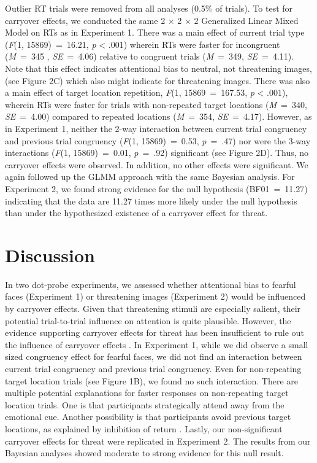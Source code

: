 \documentclass[issue,header,twocolumn,empirical, authordate,10pt]{jote-new-article}
\begin{document}
Outlier RT trials were removed from all analyses (0.5\% of trials). To test for carryover effects, we conducted the same 2 × 2 × 2 Generalized Linear Mixed Model on RTs as in Experiment 1. There was a main effect of current trial type (\emph{F}(1, 15869)~=~16.21, \emph{p }< .001) wherein RTs were faster for incongruent (\emph{M}~=~345 , \emph{SE}~=~4.06) relative to congruent trials (\emph{M}~=~349, \emph{SE}~=~4.11). Note that this effect indicates attentional bias to neutral, not threatening images, (see Figure 2C) which also might indicate for threatening images. There was also a main effect of target location repetition, \emph{F}(1, 15869~=~167.53, \emph{p }< .001), wherein RTs were faster for trials with non-repeated target locations (\emph{M}~=~340, \emph{SE}~=~4.00) compared to repeated locations (\emph{M}~=~354, \emph{SE}~=~4.17). However, as in Experiment 1, neither the 2-way interaction between current trial congruency and previous trial congruency (\emph{F}(1, 15869)~=~0.53, \emph{p}~=~.47) nor were the 3-way interactions (\emph{F}(1, 15869)~=~0.01, \emph{p}~=~.92) significant (see Figure 2D). Thus, no carryover effects were observed. In addition, no other effects were significant. We again followed up the GLMM approach with the same Bayesian analysis. For Experiment 2, we found strong evidence for the null hypothesis (BF01~=~11.27) indicating that the data are 11.27 times more likely under the null hypothesis than under the hypothesized existence of a carryover effect for threat.






\section{Discussion}

In two dot-probe experiments, we assessed whether attentional bias to fearful faces (Experiment 1) or threatening images (Experiment 2) would be influenced by carryover effects. Given that threatening stimuli are especially salient, their potential trial-to-trial influence on attention is quite plausible. However, the evidence supporting carryover effects for threat has been insufficient to rule out the influence of carryover effects \parencite{Gladwin2019a, Hill2016}. In Experiment 1, while we did observe a small sized congruency effect for fearful faces, we did not find an interaction between current trial congruency and previous trial congruency. Even for non-repeating target location trials (see Figure 1B), we found no such interaction. There are multiple potential explanations for faster responses on non-repeating target location trials. One is that participants strategically attend away from the emotional cue. Another possibility is that participants avoid previous target locations, as explained by inhibition of return \parencite{Posner1985}. Lastly, our non-significant carryover effects for threat were replicated in Experiment 2. The results from our Bayesian analyses showed moderate to strong evidence for this null result.
\end{document}
